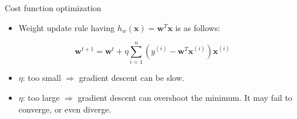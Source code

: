 \documentclass[serif, aspectratio=169]{beamer}
\begin{document}
\begin{frame}{Cost function optimization}
    \begin{itemize}
        \item Weight update rule having $h_w(\mathbf{x}) = \mathbf{w}^T \mathbf{x}$ is as follows:
    \end{itemize}
    
    \[
    \mathbf{w}^{t+1} = \mathbf{w}^t + \eta \sum_{i=1}^{n} \left( y^{(i)} - \mathbf{w}^T \mathbf{x}^{(i)} \right) \mathbf{x}^{(i)}
    \]

    \begin{itemize}
        \item $\eta$: too small $\Rightarrow$ gradient descent can be slow.
        \item $\eta$: too large $\Rightarrow$ gradient descent can overshoot the minimum. It may fail to converge, or even diverge.
    \end{itemize}
\end{frame}
\end{document}

